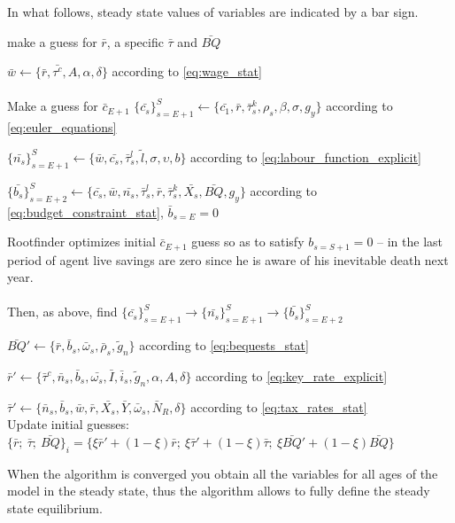 In what follows, steady state values of variables are indicated by a bar sign.
\begin{algorithm}[H]
\caption{Steady State solution algorithm}
\label{algo:steady_state_solution}
\begin{algorithmic}
    \Require make a guess for $\bar{r}$, a specific $\bar{\tau}$ and $\bar{BQ}$
    \Repeat

    \State $\bar{w} \gets \{\bar{r}, \bar{\tau^c}, A, \alpha, \delta \}$ according to \textcolor{Fuchsia}{\eqref{eq:wage_stat}} \\

    \hrulefill\\
        \State Make a guess for $\bar{c}_{E+1}$
        \State $\{ \bar{c_s} \}^S_{s=E+1} \gets \{ \bar{c_1}, \bar{r}, \bar{\tau}^k_s, \rho_s, \beta, \sigma, g_y \}$ according to \textcolor{Fuchsia}{\eqref{eq:euler_equations}}

        \State $\{ \bar{n_s} \}^S_{s=E+1} \gets \{ \bar{w}, \bar{c_s}, \bar{\tau}^l_s, \tilde{l}, \sigma, \upsilon, b \}$ according to \textcolor{Fuchsia}{\eqref{eq:labour_function_explicit}}

        \State $\{ \bar{b_s} \}^S_{s=E+2} \gets \{ \bar{c_s}, \bar{w}, \bar{n_s}, \bar{\tau}^l_s, \bar{r}, \bar{\tau}^k_s, \bar{X_s}, \bar{BQ}, g_y \}$ according to \textcolor{Fuchsia}{\eqref{eq:budget_constraint_stat}}, $\bar{b}_{s=E} = 0$

        \State Rootfinder optimizes initial $\bar{c}_{E+1}$ guess so as to satisfy $b_{s=S+1}=0$ -- in the last
        \State period of agent live savings are zero since he is aware of his inevitable death
        \State next year.\\
    \hrulefill\\

    \State Then, as above, find $\{ \bar{c_s} \}^S_{s=E+1} \rightarrow \{ \bar{n_s} \}^S_{s=E+1} \rightarrow \{ \bar{b_s} \}^S_{s=E+2}$

    \State $\bar{BQ}' \gets \{ \bar{r}, \bar{b}_s, \bar{\omega}_s, \bar{\rho}_s, \tilde{g}_n \}$ according to \textcolor{Fuchsia}{\eqref{eq:bequests_stat}}

    \State $\bar{r}' \gets \{ \bar{\tau}^c,   \bar{n}_s, \bar{b}_s, \bar{\omega_s}, \bar{I}, \bar{i}_s, \tilde{g}_n, \alpha, A, \delta \}$ according to \textcolor{Fuchsia}{\eqref{eq:key_rate_explicit}}

    \State $\bar{\tau}' \gets \{  \bar{n}_s, \bar{b}_s, \bar{w}, \bar{r}, \bar{X_s}, \bar{Y}, \bar{\omega}_s, \bar{N}_R, \delta \}$ according to \textcolor{Fuchsia}{\eqref{eq:tax_rates_stat}}\\

    \State Update initial guesses: $\{ \bar{r};\  \bar{\tau};\ \bar{BQ} \}_i = \{ \xi \bar{r}' + (1 - \xi)\bar{r};\ \xi \bar{\tau}' + (1 - \xi) \bar{\tau};\ \xi \bar{BQ}' + (1 - \xi) \bar{BQ} \} $

    \State {}
\end{algorithmic}
\end{algorithm}

When the algorithm is converged you obtain all the variables for all ages of the model in the steady state, thus the algorithm allows to fully define the steady state equilibrium. 
